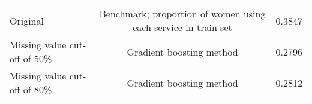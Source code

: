 \documentclass{article}\usepackage[]{graphicx}\usepackage[]{color}
\begin{document}
\begin{table}[ht]
\begin{tabular}{@{}|l|c|c|@{}}
                                                                                                                                                                                                                                                                                                                                                                                                                                                                                                                                                                                                \hline
                                                                                                                                                                                                                                                                                                                                                                                                                                                                                                                                                                                                Original & Benchmark; proportion of women using each service in train set & 0.3847 \\ 
                                                                                                                                                                                                                                                                                                                                                                                                                                                                                                                                                                                                Missing value cut-off of 50\% & Gradient boosting method & 0.2796 \\ 
                                                                                                                                                                                                                                                                                                                                                                                                                                                                                                                                                                                                Missing value cut-off of 80\% & Gradient boosting method & 0.2812 \\

\end{tabular}
\end{table}
\end{document}
